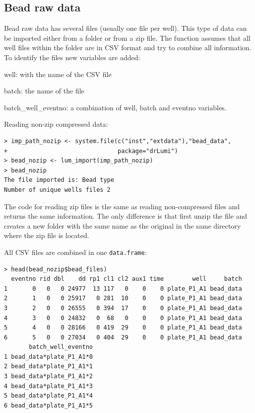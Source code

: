 \documentclass[11pt]{article}\usepackage[]{graphicx}\usepackage[]{color}
\makeatletter
\newenvironment{kframe}{%
 \def\at@end@of@kframe{}%
 \ifinner\ifhmode%
  \def\at@end@of@kframe{\end{minipage}}%
  \begin{minipage}{\columnwidth}%
 \fi\fi%
 \def\FrameCommand##1{\hskip\@totalleftmargin \hskip-\fboxsep
 \colorbox{shadecolor}{##1}\hskip-\fboxsep
     \hskip-\linewidth \hskip-\@totalleftmargin \hskip\columnwidth}%
 \MakeFramed {\advance\hsize-\width
   \@totalleftmargin\z@ \linewidth\hsize
   \@setminipage}}%
 {\par\unskip\endMakeFramed%
 \at@end@of@kframe}
\newenvironment{knitrout}{}{} %
\newenvironment{itemize*}%
    {\begin{itemize}%
        \setlength{\itemsep}{-0.35cm}%
        \setlength{\parskip}{10pt}}%
{\end{itemize}}
\makeatother
\begin{document}
\subsection{Bead raw data}
Bead raw data has several files (usually one file per well). This type of data
can be imported either from a folder or from a zip file. The 
function assumes that all well files within the folder are in CSV format and 
try to combine all information. To identify the files new variables are added:

\begin{itemize*}
\item well: with the name of the CSV file
\item batch: the name of the file
\item batch\_well\_eventno: a combination of well, batch and eventno variables.
\end{itemize*}

\noindent Reading non-zip compressed data:
\begin{knitrout}
\color{fgcolor}\begin{kframe}
\begin{verbatim}
> imp_path_nozip <- system.file(c("inst","extdata"),"bead_data", 
+                               package="drLumi")
> bead_nozip <- lum_import(imp_path_nozip)
> bead_nozip
The file imported is: Bead type 
Number of unique wells files 2 
\end{verbatim}
\end{kframe}
\end{knitrout}

\noindent The code for reading zip files is the same as reading
non-compressed files and returns the same information. The only difference is
that first unzip the file and creates a new folder with the same name as the original
in the same directory where the zip file is located.

\noindent All CSV files are combined in one {\tt data.frame}:
\begin{knitrout}
\color{fgcolor}\begin{kframe}
\begin{verbatim}
> head(bead_nozip$bead_files)
  eventno rid dbl    dd rp1 cl1 cl2 aux1 time        well     batch
1       0   0   0 24977  13 117   0    0    0 plate_P1_A1 bead_data
2       1   0   0 25917   0 281  10    0    0 plate_P1_A1 bead_data
3       2   0   0 26555   0 394  17    0    0 plate_P1_A1 bead_data
4       3   0   0 24832   0  68   0    0    0 plate_P1_A1 bead_data
5       4   0   0 28166   0 419  29    0    0 plate_P1_A1 bead_data
6       5   0   0 27034   0 404  29    0    0 plate_P1_A1 bead_data
       batch_well_eventno
1 bead_data*plate_P1_A1*0
2 bead_data*plate_P1_A1*1
3 bead_data*plate_P1_A1*2
4 bead_data*plate_P1_A1*3
5 bead_data*plate_P1_A1*4
6 bead_data*plate_P1_A1*5
\end{verbatim}
\end{kframe}
\end{knitrout}
\end{document}
